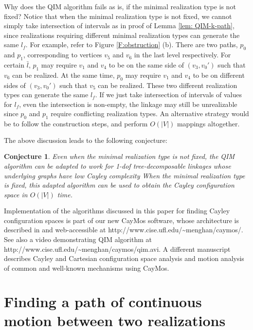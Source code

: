 \documentclass[secthm,amsthm,english]{article}
\newtheorem{conjecture}{Conjecture}
\theoremstyle{definition}
\theoremstyle{remark}
\begin{document}
\medskip

Why does the QIM algorithm fails as is,  
if the minimal realization type is not fixed? 
Notice that when the minimal realization type is not fixed, 
we cannot simply take intersection of intervals as in proof of Lemma \ref{lem: QIM-k-path}, since realizations requiring different minimal realization types can generate the same  $l_f$. For example, refer to Figure \ref{F:obstruction} (b). 
There are two paths, $p_0$ and $p_1$, 
corresponding to vertices $v_5$ and $v_6$ in the last level respectively. 
For certain $\bar{l}$, 
$p_1$ may require $v_1$ and $v_4$ to be on the same side of $(v_3,v_0')$ such that $v_6$ can be realized. 
At the same time, 
$p_0$ may require $v_1$ and $v_4$ to be on different sides of $(v_3,v_0')$ such that $v_5$ can be realized.
These two different realization types can generate the same $l_f$. If we just take intersection of intervals of values for $l_f$, even the intersection is non-empty, the linkage may still be unrealizable since $p_0$ and $p_1$ require conflicting realization types. 
An alternative strategy would be to follow the construction steps, 
and perform $O(|V|)$ mappings altogether. 

The above discussion leads to the following conjecture: 

\begin{conjecture}
Even when the minimal realization type is not fixed, 
the QIM algorithm can be adapted to work for 1-dof tree-decomposable linkages whose underlying graphs have low Cayley complexity 
When the minimal realization type is fixed, 
this adapted algorithm can be used to obtain the Cayley configuration space in $O(|V|)$ time. 
\end{conjecture}

\medskip
\noindent 
Implementation of the algorithms discussed in this paper 
for finding Cayley configuration spaces is part of our new CayMos software,
whose architecture is described in \cite{bib:caymos} and 
web-accessible at http://www.cise.ufl.edu/\~{}menghan/caymos/. 
See also a video demonstrating QIM algorithm 
at http://www.cise.ufl.edu/\~{}menghan/caymos/qim.avi.
A different manuscript \cite{bib:beest} describes Cayley and Cartesian configuration space analysis and motion analysis 
of common and well-known mechanisms using CayMos.



\section{Finding a path of continuous motion between two realizations}
\label{sec:cont-path}
\end{document}
